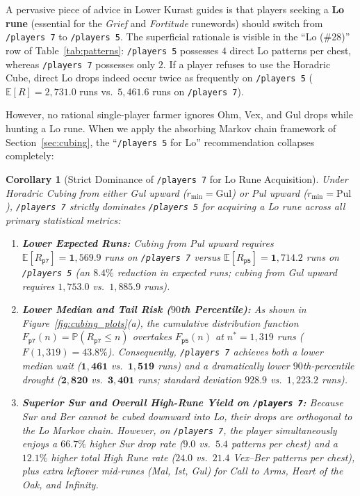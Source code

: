 \documentclass[11pt,reqno]{amsart}
\newtheorem{corollary}[theorem]{Corollary}
\theoremstyle{definition}
\begin{document}
A pervasive piece of advice in Lower Kurast guides is that players seeking a \textbf{Lo rune} (essential for the \emph{Grief} and \emph{Fortitude} runewords) should switch from \texttt{/players~7} to \texttt{/players~5}. The superficial rationale is visible in the ``Lo (\#28)'' row of Table~\ref{tab:patterns}: \texttt{/players~5} possesses $4$ direct Lo patterns per chest, whereas \texttt{/players~7} possesses only $2$. If a player refuses to use the Horadric Cube, direct Lo drops indeed occur twice as frequently on \texttt{/players~5} ($\mathbb{E}[R] = 2{,}731.0$ runs vs.\ $5{,}461.6$ runs on \texttt{/players~7}).

However, no rational single-player farmer ignores Ohm, Vex, and Gul drops while hunting a Lo rune. When we apply the absorbing Markov chain framework of Section~\ref{sec:cubing}, the ``\texttt{/players~5} for Lo'' recommendation collapses completely:

\begin{corollary}[Strict Dominance of \texttt{/players~7} for Lo Rune Acquisition]
\label{cor:lo_myth}
Under Horadric Cubing from either Gul upward ($r_{\min} = \text{Gul}$) or Pul upward ($r_{\min} = \text{Pul}$), \texttt{/players~7} strictly dominates \texttt{/players~5} for acquiring a Lo rune across all primary statistical metrics:
\begin{enumerate}
    \item \textbf{Lower Expected Runs:} Cubing from Pul upward requires $\mathbb{E}[R_{\texttt{p7}}] = \mathbf{1{,}569.9}$ runs on \texttt{/players~7} versus $\mathbb{E}[R_{\texttt{p5}}] = \mathbf{1{,}714.2}$ runs on \texttt{/players~5} (an $8.4\%$ reduction in expected runs; cubing from Gul upward requires $1{,}753.0$ vs.\ $1{,}885.9$ runs).
    \item \textbf{Lower Median and Tail Risk ($90$th Percentile):} As shown in Figure~\ref{fig:cubing_plots}(a), the cumulative distribution function $F_{\texttt{p7}}(n) = \mathbb{P}(R_{\texttt{p7}} \le n)$ overtakes $F_{\texttt{p5}}(n)$ at $n^* = 1{,}319$ runs ($F(1{,}319) = 43.8\%$). Consequently, \texttt{/players~7} achieves both a lower median wait ($\mathbf{1{,}461}$ vs.\ $\mathbf{1{,}519}$ runs) and a dramatically lower $90$th-percentile drought ($\mathbf{2{,}820}$ vs.\ $\mathbf{3{,}401}$ runs; standard deviation $928.9$ vs.\ $1{,}223.2$ runs).
    \item \textbf{Superior Sur and Overall High-Rune Yield on \texttt{/players~7}:} Because Sur and Ber cannot be cubed downward into Lo, their drops are orthogonal to the Lo Markov chain. However, on \texttt{/players~7}, the player simultaneously enjoys a $66.7\%$ higher Sur drop rate ($9.0$ vs.\ $5.4$ patterns per chest) and a $12.1\%$ higher total High Rune rate ($24.0$ vs.\ $21.4$ Vex--Ber patterns per chest), plus extra leftover mid-runes (Mal, Ist, Gul) for \emph{Call to Arms}, \emph{Heart of the Oak}, and \emph{Infinity}.
\end{enumerate}
\end{corollary}
\end{document}
